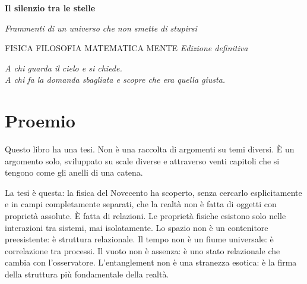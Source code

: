 \documentclass[11.5pt,a4paper,openany]{book}
\theoremstyle{remark}
\begin{document}
\begin{titlepage}
\begin{center}
\vspace*{5.5cm}
{\fontsize{36}{44}\selectfont\bfseries\color{inkblue} Il silenzio tra le stelle}
\vspace{1.8em}

{\fontsize{12}{18}\selectfont\itshape\color{headink}
  Frammenti di un universo che non smette di stupirsi}
\vspace{4.5em}

{\footnotesize\scshape\color{captionink}\MakeUppercase{%
  Fisica \enspace\textperiodcentered\enspace
  Filosofia \enspace\textperiodcentered\enspace
  Matematica \enspace\textperiodcentered\enspace
  Mente}}
\vfill
{\footnotesize\itshape\color{headink} Edizione definitiva}
\vspace{2cm}
\end{center}
\end{titlepage}

\thispagestyle{empty}
\vspace*{10cm}
\begin{center}
{\small\itshape\color{captionink}
  A chi guarda il cielo e si chiede.\\[0.3em]
  A chi fa la domanda sbagliata e scopre che era quella giusta.}
\end{center}
\clearpage

\chapter*{Proemio}

Questo libro ha una tesi. Non è una raccolta di argomenti su temi diversi. È un argomento solo, sviluppato su scale diverse e attraverso venti capitoli che si tengono come gli anelli di una catena.

La tesi è questa: la fisica del Novecento ha scoperto, senza cercarlo esplicitamente e in campi completamente separati, che la realtà non è fatta di oggetti con proprietà assolute. È fatta di relazioni. Le proprietà fisiche esistono solo nelle interazioni tra sistemi, mai isolatamente. Lo spazio non è un contenitore preesistente: è struttura relazionale. Il tempo non è un fiume universale: è correlazione tra processi. Il vuoto non è assenza: è uno stato relazionale che cambia con l'osservatore. L'entanglement non è una stranezza esotica: è la firma della struttura più fondamentale della realtà.
\end{document}
